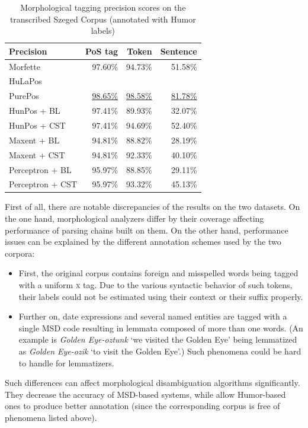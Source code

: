 \begin{table}[H]
 \centering
 \caption{Morphological tagging precision scores on the transcribed Szeged Corpus (annotated with Humor labels)}
\begin{tabular}{l r r r}
  \hline
  Precision &  PoS tag &  Token &  Sentence \\
  \hline
  Morfette &  97.60\% &  94.73\% &  51.58\% \\
  HuLaPos &   &   &   \\
  PurePos &  \underline{98.65\%} &  \underline{98.58\%} &  \underline{81.78\%} \\
  HunPos + BL &  97.41\% &  89.93\% &  32.07\% \\
  HunPos + CST &  97.41\% &  94.69\% &  52.40\% \\
  Maxent + BL &  94.81\% &  88.82\% &  28.19\% \\
  Maxent + CST &  94.81\% &  92.33\% &  40.10\% \\
  Perceptron + BL &  95.97\% &  88.85\% &  29.11\% \\
  Perceptron + CST &  95.97\% &  93.32\% &  45.13\% \\
  \hline
\end{tabular}
\label{tab:morphtag-humor}
\end{table}


First of all, there are notable discrepancies of the results on the two datasets. 
On the one hand, morphological analyzers differ by their coverage affecting performance of parsing chains built on them.
On the other hand, performance issues can be explained by the different annotation schemes used by the two corpora:
\begin{itemize}
  \item First, the original corpus contains foreign and misspelled words being tagged with a uniform \textsc{x} tag. 
  Due to the various syntactic behavior of such tokens, their labels could not be estimated using their context or their suffix properly.
  \item Further on, date expressions and several named entities are tagged with a single MSD code resulting in lemmata composed of more than one words. (An example is \emph{Golden Eye-oztunk} `we visited the Golden Eye’ being lemmatized as \emph{Golden Eye-ozik} `to visit the Golden Eye’.) 
  Such phenomena could be hard to handle for lemmatizers.
\end{itemize}
Such differences can affect morphological disambiguation algorithms significantly.
They decrease the accuracy of MSD-based systems, while allow Humor-based ones to produce better annotation  (since the corresponding corpus is free of phenomena listed above).


